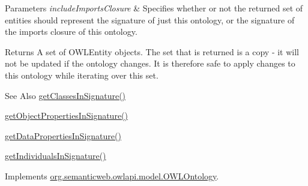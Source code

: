 \begin{DoxyParams}{Parameters}
{\em include\-Imports\-Closure} & Specifies whether or not the returned set of entities should represent the signature of just this ontology, or the signature of the imports closure of this ontology. \\
\hline
\end{DoxyParams}
\begin{DoxyReturn}{Returns}
A set of {\ttfamily O\-W\-L\-Entity} objects. The set that is returned is a copy -\/ it will not be updated if the ontology changes. It is therefore safe to apply changes to this ontology while iterating over this set. 
\end{DoxyReturn}
\begin{DoxySeeAlso}{See Also}
\hyperlink{classuk_1_1ac_1_1manchester_1_1cs_1_1owl_1_1owlapi_1_1_o_w_l_ontology_impl_a23c6f915fb0280a209488bbba9aa7cd7}{get\-Classes\-In\-Signature()} 

\hyperlink{classuk_1_1ac_1_1manchester_1_1cs_1_1owl_1_1owlapi_1_1_o_w_l_ontology_impl_aba140617158cd396e53ab9db936e3efb}{get\-Object\-Properties\-In\-Signature()} 

\hyperlink{classuk_1_1ac_1_1manchester_1_1cs_1_1owl_1_1owlapi_1_1_o_w_l_ontology_impl_abd702148da4427999fa95906a016bc01}{get\-Data\-Properties\-In\-Signature()} 

\hyperlink{classuk_1_1ac_1_1manchester_1_1cs_1_1owl_1_1owlapi_1_1_o_w_l_ontology_impl_ae77046b1c8241e338236cb55fd7fc848}{get\-Individuals\-In\-Signature()} 
\end{DoxySeeAlso}


Implements \hyperlink{interfaceorg_1_1semanticweb_1_1owlapi_1_1model_1_1_o_w_l_ontology_a86133864a3dc50b9ad7be0093aef6b9c}{org.\-semanticweb.\-owlapi.\-model.\-O\-W\-L\-Ontology}.

